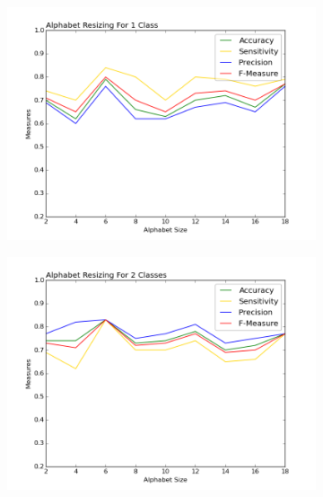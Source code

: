 \documentclass{mini}
\begin{document}
\begin{figure}
\begin{subfigure}{.5\textwidth}
  \centering
  \includegraphics[width=1\linewidth]{images/a_c1_fig.png}
  \label{fig:sfig1}
\end{subfigure}%
\begin{subfigure}{.5\textwidth}
  \centering
  \includegraphics[width=1\linewidth]{images/a_c2_fig.png}
  \label{fig:sfig2}
\end{subfigure}
\begin{subfigure}{.5\textwidth}
  \centering

\end{subfigure}
\end{figure}
\end{document}
